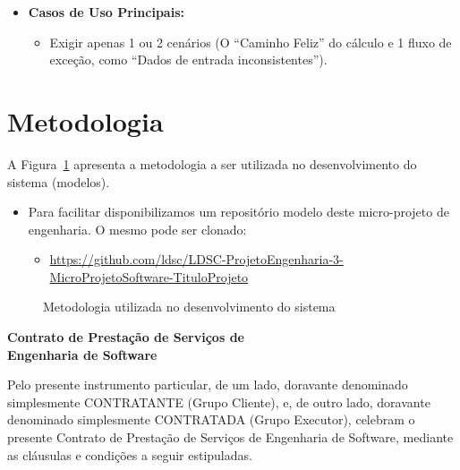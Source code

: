 \documentclass[12pt,a4paper]{article}
\begin{document}
\begin{itemize}
  \item \textbf{Casos de Uso Principais:}
  \begin{itemize}
    \item Exigir apenas 1 ou 2 cenários (O ``Caminho Feliz'' do cálculo e 1 fluxo de exceção, como ``Dados de entrada inconsistentes'').
  \end{itemize}
\end{itemize}

\section*{Metodologia}

A Figura~\ref{fig:metodologia} apresenta a metodologia a ser utilizada no desenvolvimento do sistema (modelos).

\begin{itemize}
  \item Para facilitar disponibilizamos um repositório modelo deste micro-projeto de engenharia. O mesmo pode ser clonado:
  \begin{itemize}
    \item \url{https://github.com/ldsc/LDSC-ProjetoEngenharia-3-MicroProjetoSoftware-TituloProjeto}
  \end{itemize}
\end{itemize}

\begin{figure}[h!]
  \centering
  \caption{Metodologia utilizada no desenvolvimento do sistema}
  \label{fig:metodologia}
\end{figure}

\newpage
\begin{center}
  {\Large \textbf{Contrato de Prestação de Serviços de\\[0.3cm] Engenharia de Software}}
\end{center}

\vspace{0.5cm}

Pelo presente instrumento particular, de um lado, doravante denominado simplesmente CONTRATANTE (Grupo Cliente), e, de outro lado, doravante denominado simplesmente CONTRATADA (Grupo Executor), celebram o presente Contrato de Prestação de Serviços de Engenharia de Software, mediante as cláusulas e condições a seguir estipuladas.
\end{document}
